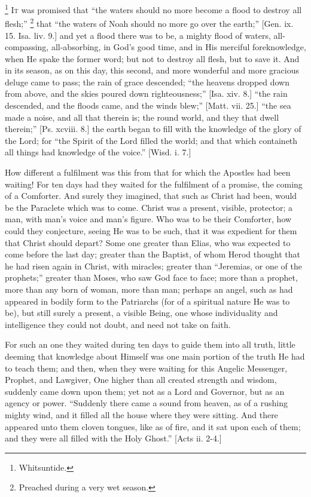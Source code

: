 \footnote{Whitsuntide.} I\textsc{t} was promised that ``the waters should no more become a flood
to destroy all flesh;'' \footnote{Preached during a very wet season.}
that ``the waters of Noah should no more go over the earth;''
[Gen. ix. 15. Isa. liv. 9.] and yet a flood there was to be, a mighty
flood of waters, all-compassing, all-absorbing, in God's good time,
and in His merciful foreknowledge, when He spake the former word; but
not to destroy all flesh, but to save it. And in its season, as on
this day, this second,
and more wonderful and more gracious deluge came to pass; the rain of
grace descended; ``the heavens dropped down from above, and the
skies poured down righteousness;'' [Isa. xiv. 8.] ``the rain
descended, and the floods came, and the winds blew;'' [Matt. vii.
25.] ``the sea made a noise, and all that therein is; the round
world, and they that dwell therein;'' [Ps. xcviii. 8.] the earth
began to fill with the knowledge of the glory of the Lord; for
``the Spirit of the Lord filled the world; and that which
containeth all things had knowledge of the voice.'' [Wisd. i. 7.]

How different a fulfilment was this from that for which the
Apostles had been waiting! For ten days had they waited for the
fulfilment of a promise, the coming of a Comforter. And surely they
imagined, that such as Christ had been, would be the Paraclete which
was to come. Christ was a present, visible, protector; a man, with
man's voice and man's figure. Who was to be their Comforter, how could
they conjecture, seeing He was to be such, that it was expedient for
them that Christ should depart? Some one greater than Elias, who was
expected to come before the last day; greater than the Baptist, of
whom Herod thought that he had risen again in Christ, with miracles;
greater than ``Jeremias, or one of the prophets;'' greater
than Moses, who saw God face to face; more than a prophet, more than
any born of woman, more than man; perhaps an angel, such as had
appeared in bodily form to the Patriarchs (for of a spiritual nature
He was to be), but still surely a present, a visible Being, one whose
individuality and intelligence they could not doubt, and need not take
on faith.

For such an one they waited during ten days to guide them into all
truth, little deeming that knowledge about Himself was one main
portion of the truth He had to teach them; and then, when they were
waiting for this Angelic Messenger, Prophet, and Lawgiver, One higher
than all created strength and wisdom, suddenly came down upon them; yet
not as a Lord and Governor, but as an agency or power. ``Suddenly
there came a sound from heaven, as of a rushing mighty wind, and it
filled all the house where they were sitting. And there appeared unto
them cloven tongues, like as of fire, and it sat upon each of them;
and they were all filled with the Holy Ghost.'' [Acts ii. 2-4.]

